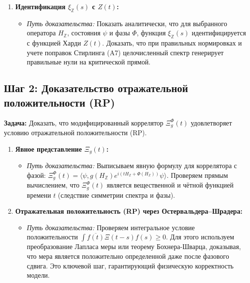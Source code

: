 \documentclass{article}
\numberwithin{equation}{section}
\theoremstyle{plain}
\theoremstyle{definition}
\theoremstyle{remark}
\begin{document}
\begin{enumerate}
    \item \textbf{Идентификация \( \xi_{\mathbb{Z}}(s) \) с \( Z(t) \):}
    \begin{itemize}
        \item \emph{Путь доказательства:} Показать аналитически, что для выбранного оператора \( H_{\mathbb{Z}} \), состояния \(\psi\) и фазы \(\Phi\), функция \( \xi_{\mathbb{Z}}(s) \) идентифицируется с функцией Харди \( Z(t) \). Доказать, что при правильных нормировках и учете поправок Стирлинга (A7) целочисленный спектр генерирует правильные нули на критической прямой.
    \end{itemize}
\end{enumerate}

\subsection*{Шаг 2: Доказательство отражательной положительности (RP)}
\textbf{Задача:} Доказать, что модифицированный коррелятор $\Xi_g^\Phi(t)$ удовлетворяет условию отражательной положительности (RP).
\begin{enumerate}
    \item \textbf{Явное представление $\Xi_g(t)$:}
    \begin{itemize}
        \item \emph{Путь доказательства:} Выписываем явную формулу для коррелятора с фазой: $\Xi_g^\Phi(t) = \langle \psi, g(H_{\mathbb{Z}}) e^{i(tH_{\mathbb{Z}} + \Phi(H_{\mathbb{Z}}))} \psi \rangle$. Проверяем прямым вычислением, что $\Xi_g^\Phi(t)$ является вещественной и чётной функцией времени $t$ (следствие симметрии спектра и фазы).
    \end{itemize}
    \item \textbf{Отражательная положительность (RP) через Остервальдера–Шрадера:}
    \begin{itemize}
        \item \emph{Путь доказательства:} Проверяем интегральное условие положительности $\int \overline{f(t)} \Xi(t-s) f(s) \ge 0$. Для этого используем преобразование Лапласа меры или теорему Бохнера-Шварца, доказывая, что мера является положительно определенной даже после фазового сдвига. Это ключевой шаг, гарантирующий физическую корректность модели.
    \end{itemize}
\end{enumerate}
\end{document}
